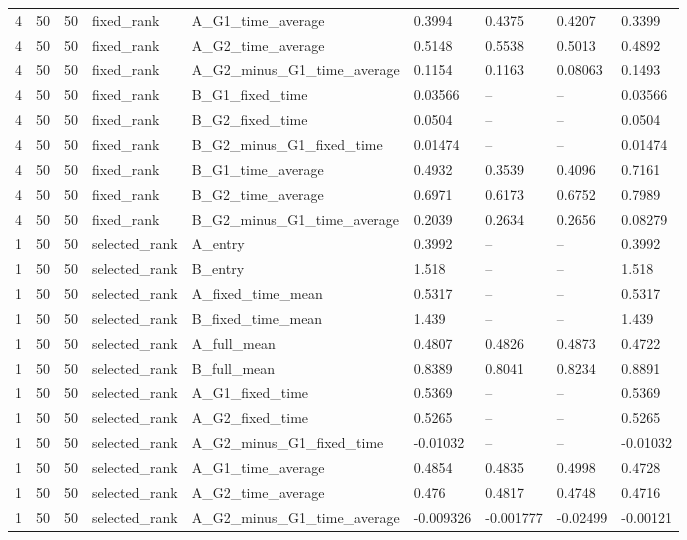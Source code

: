 \begin{longtable}{lllllllll}
4 & 50 & 50 & fixed\_rank & A\_G1\_time\_average & 0.3994 & 0.4375 & 0.4207 & 0.3399 \\
4 & 50 & 50 & fixed\_rank & A\_G2\_time\_average & 0.5148 & 0.5538 & 0.5013 & 0.4892 \\
4 & 50 & 50 & fixed\_rank & A\_G2\_minus\_G1\_time\_average & 0.1154 & 0.1163 & 0.08063 & 0.1493 \\
4 & 50 & 50 & fixed\_rank & B\_G1\_fixed\_time & 0.03566 & -- & -- & 0.03566 \\
4 & 50 & 50 & fixed\_rank & B\_G2\_fixed\_time & 0.0504 & -- & -- & 0.0504 \\
4 & 50 & 50 & fixed\_rank & B\_G2\_minus\_G1\_fixed\_time & 0.01474 & -- & -- & 0.01474 \\
4 & 50 & 50 & fixed\_rank & B\_G1\_time\_average & 0.4932 & 0.3539 & 0.4096 & 0.7161 \\
4 & 50 & 50 & fixed\_rank & B\_G2\_time\_average & 0.6971 & 0.6173 & 0.6752 & 0.7989 \\
4 & 50 & 50 & fixed\_rank & B\_G2\_minus\_G1\_time\_average & 0.2039 & 0.2634 & 0.2656 & 0.08279 \\
1 & 50 & 50 & selected\_rank & A\_entry & 0.3992 & -- & -- & 0.3992 \\
1 & 50 & 50 & selected\_rank & B\_entry & 1.518 & -- & -- & 1.518 \\
1 & 50 & 50 & selected\_rank & A\_fixed\_time\_mean & 0.5317 & -- & -- & 0.5317 \\
1 & 50 & 50 & selected\_rank & B\_fixed\_time\_mean & 1.439 & -- & -- & 1.439 \\
1 & 50 & 50 & selected\_rank & A\_full\_mean & 0.4807 & 0.4826 & 0.4873 & 0.4722 \\
1 & 50 & 50 & selected\_rank & B\_full\_mean & 0.8389 & 0.8041 & 0.8234 & 0.8891 \\
1 & 50 & 50 & selected\_rank & A\_G1\_fixed\_time & 0.5369 & -- & -- & 0.5369 \\
1 & 50 & 50 & selected\_rank & A\_G2\_fixed\_time & 0.5265 & -- & -- & 0.5265 \\
1 & 50 & 50 & selected\_rank & A\_G2\_minus\_G1\_fixed\_time & -0.01032 & -- & -- & -0.01032 \\
1 & 50 & 50 & selected\_rank & A\_G1\_time\_average & 0.4854 & 0.4835 & 0.4998 & 0.4728 \\
1 & 50 & 50 & selected\_rank & A\_G2\_time\_average & 0.476 & 0.4817 & 0.4748 & 0.4716 \\
1 & 50 & 50 & selected\_rank & A\_G2\_minus\_G1\_time\_average & -0.009326 & -0.001777 & -0.02499 & -0.00121 \\

\end{longtable}
